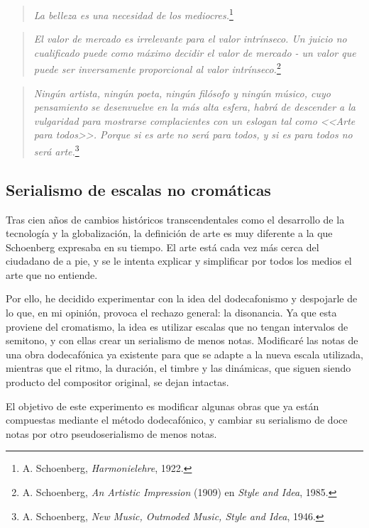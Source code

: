 	\begin{quote}
		\emph{La belleza es una necesidad de los mediocres.}\footnote{A. Schoenberg, \emph{Harmonielehre}, 1922.}
	\end{quote}
	\begin{quote}
		\emph{El valor de mercado es irrelevante para el valor intrínseco. Un juicio no cualificado puede como máximo decidir el valor de mercado - un valor que puede ser inversamente proporcional al valor intrínseco.}\footnote{A. Schoenberg, \emph{An Artistic Impression} (1909) en \emph{Style and Idea}, 1985.}
	\end{quote}
	\begin{quote}
		\emph{Ningún artista, ningún poeta, ningún filósofo y ningún músico, cuyo pensamiento se desenvuelve en la más alta esfera, habrá de descender a la vulgaridad para mostrarse complacientes con un eslogan tal como <<Arte para todos>>. Porque si es arte no será para todos, y si es para todos no será arte.}\footnote{A. Schoenberg, \emph{New Music, Outmoded Music, Style and Idea}, 1946.}
	\end{quote}
	
	\subsection{Serialismo de escalas no cromáticas}
	Tras cien años de cambios históricos transcendentales como el desarrollo de la tecnología y la globalización, la definición de arte es muy diferente a la que Schoenberg expresaba en su tiempo. El arte está cada vez más cerca del ciudadano de a pie, y se le intenta explicar y simplificar por todos los medios el arte que no entiende.
	
	Por ello, he decidido experimentar con la idea del dodecafonismo y despojarle de lo que, en mi opinión, provoca el rechazo general: la disonancia. Ya que esta proviene del cromatismo, la idea es utilizar escalas que no tengan intervalos de semitono, y con ellas crear un serialismo de menos notas. Modificaré las notas de una obra dodecafónica ya existente para que se adapte a la nueva escala utilizada, mientras que el ritmo, la duración, el timbre y las dinámicas, que siguen siendo producto del compositor original, se dejan intactas.
	
	El objetivo de este experimento es modificar algunas obras que ya están compuestas mediante el método dodecafónico, y cambiar su serialismo de doce notas por otro pseudoserialismo de menos notas. 